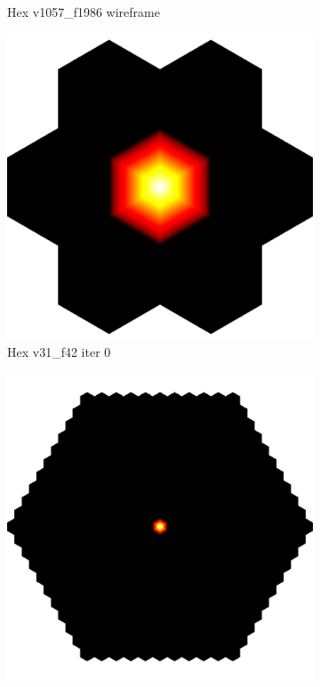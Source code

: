 \begin{figure}[ht]
{\begin{subfigure}[b]{0.48\linewidth}
		\caption{Hex v1057\_f1986 wireframe}\label{fig:hex.b}
	\end{subfigure}

	\bigskip
	\begin{subfigure}[b]{0.48\linewidth}
		\includegraphics[width=1.0\linewidth,height=0.3\textheight,keepaspectratio]{data/synthetic_meshes/hexagonal_tessellation_Dirac_delta_1_v31_f42_funcvals_0iter_crop.png}
		\caption{Hex v31\_f42 iter 0}\label{fig:hex.c}
	\end{subfigure}
	\begin{subfigure}[b]{0.48\linewidth}
		\includegraphics[width=1.0\linewidth,height=0.3\textheight,keepaspectratio]{data/synthetic_meshes/hexagonal_tessellation_Dirac_delta_10_v1057_f1986_funcvals_0iter_crop.png}

\end{subfigure}}
\end{figure}
